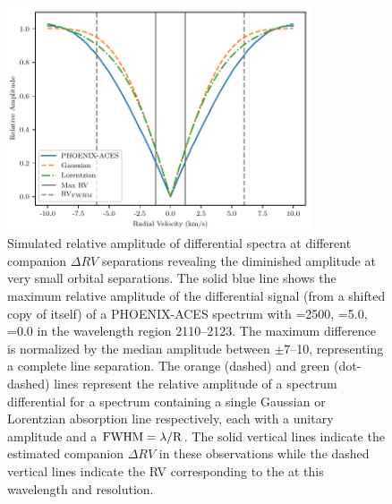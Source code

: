 \begin{figure}
    \centering
    \includegraphics[width=0.8\textwidth]{figures/direct-recovery/rv_diff_final.pdf}
    \caption[Simulated relative amplitude of differntial spectrum.]{Simulated relative amplitude of differential spectra at different companion \(\Delta {RV}\) separations revealing the diminished amplitude at very small orbital separations.
        The solid blue line shows the maximum relative amplitude of the differential signal (from a shifted copy of itself) of a {PHOENIX-ACES} spectrum with \Teff{}=2500\K{}, \Logg{}=5.0, \feh{}=0.0 in the wavelength region 2110--2123\nm{}.
        The maximum difference is normalized by the median amplitude between \(\pm7\)--10\kmps{}, representing a complete line separation.
        The orange (dashed) and green (dot-dashed) lines represent the relative amplitude of a spectrum differential for a spectrum containing a single Gaussian or Lorentzian absorption line respectively, each with a unitary amplitude and a \(\rm {\textrm{FWHM}} = \lambda / R\).
        The solid vertical lines indicate the estimated companion \(\Delta {RV}\) in these observations while the dashed vertical lines indicate the {RV} corresponding to the {\fwhm} at this wavelength and resolution.}
    \label{fig:diff_amp}
\end{figure}

